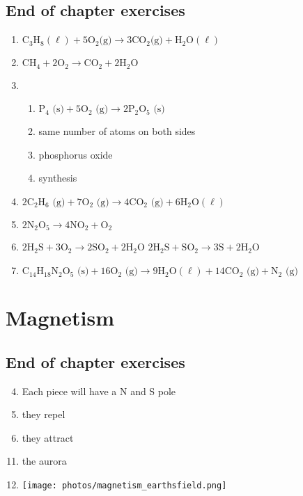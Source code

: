 \subsection{End of chapter exercises}
\begin{multicols}{2}
 \begin{enumerate}[noitemsep, label=\textbf{(\arabic*)} ]
\item ${\text{C}}_{3}{\text{H}}_{8} (\ell) + 5\text{O}_{2} \text{(g)} \to 3\text{CO}_{2} \text{(g)} + \text{H}_{2}\text{O} (\ell)$
\item $\text{CH}_{4} + 2\text{O}_{2} \to \text{CO}_{2} + 2\text{H}_{2}\text{O}$
\item 
 \begin{enumerate}[noitemsep, label=\textbf{(\alph*)} ]
\item $\text{P}_{4} \text{ (s)} + 5\text{O}_{2} \text{ (g)} \to 2\text{P}_{2}\text{O}_{5} \text{ (s)}$
\item same number of atoms on both sides
\item phosphorus oxide
\item synthesis
\end{enumerate}
\item $2\text{C}_{2}\text{H}_{6} \text{ (g)} + 7\text{O}_{2} \text{ (g)} \to 4\text{CO}_{2} \text{ (g)} + 6\text{H}_{2} \text{O} (\ell)$
\item $2\text{N}_{2}\text{O}_{5} \to 4\text{NO}_{2} + \text{O}_{2}$
\item $2\text{H}_{2}\text{S} + 3\text{O}_{2} \to 2\text{SO}_{2} + 2\text{H}_{2}\text{O}$ $2\text{H}_{2}\text{S} + \text{SO}_{2} \to 3\text{S} + 2\text{H}_{2}\text{O}$
\item $\text{C}_{14}\text{H}_{18}\text{N}_{2}\text{O}_{5} \text{ (s)} + 16\text{O}_{2} \text{ (g)} \to 9\text{H}_{2} \text{O} (\ell) + 14\text{CO}_{2} \text{ (g)} + \text{N}_{2} \text{ (g)}$
 \end{enumerate}
\end{multicols}

\section{Magnetism}
\subsection{End of chapter exercises}
\begin{multicols}{2}
 \begin{enumerate}[noitemsep, label=\textbf{(\arabic*)} ]
\setcounter{enumi}{3}
\item Each piece will have a N and S pole
\item they repel
\item they attract
\end{enumerate}
 \begin{enumerate}[noitemsep, label=\textbf{(\arabic*)} ]
\setcounter{enumi}{10}
\item the aurora
\item \texttt{[image: photos/magnetism\_earthsfield.png]}
 \end{enumerate}
\end{multicols}

